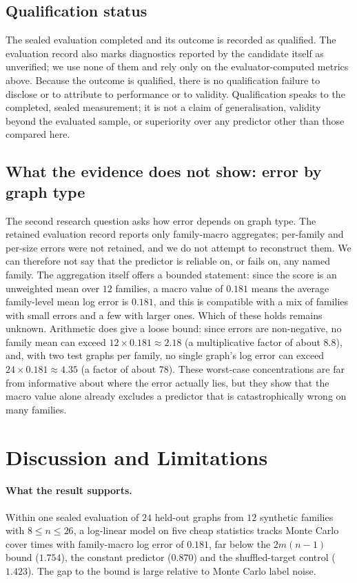 \documentclass{article}
\begin{document}
\subsection{Qualification status}
The sealed evaluation completed and its outcome is recorded as qualified. %
The evaluation record also marks diagnostics reported by the candidate itself as unverified; we use none of them and rely only on the evaluator-computed metrics above. Because the outcome is qualified, there is no qualification failure to disclose or to attribute to performance or to validity. Qualification speaks to the completed, sealed measurement; it is not a claim of generalisation, validity beyond the evaluated sample, or superiority over any predictor other than those compared here.

\subsection{What the evidence does not show: error by graph type}
The second research question asks how error depends on graph type. The retained evaluation record reports only family-macro aggregates; per-family and per-size errors were not retained, and we do not attempt to reconstruct them. We can therefore not say that the predictor is reliable on, or fails on, any named family. The aggregation itself offers a bounded statement: since the score is an unweighted mean over $12$ families, a macro value of $0.181$ means the average family-level mean log error is $0.181$, and this is compatible with a mix of families with small errors and a few with larger ones. Which of these holds remains unknown. Arithmetic does give a loose bound: since errors are non-negative, no family mean can exceed $12\times0.181\approx2.18$ (a multiplicative factor of about $8.8$), and, with two test graphs per family, no single graph's log error can exceed $24\times0.181\approx4.35$ (a factor of about $78$). %
These worst-case concentrations are far from informative about where the error actually lies, but they show that the macro value alone already excludes a predictor that is catastrophically wrong on many families.

\section{Discussion and Limitations}
\label{sec:discussion}
\paragraph{What the result supports.} Within one sealed evaluation of $24$ held-out graphs from $12$ synthetic families with $8\le n\le 26$, a log-linear model on five cheap statistics tracks Monte Carlo cover times with family-macro log error of $0.181$, far below the $2m(n-1)$ bound ($1.754$), the constant predictor ($0.870$) and the shuffled-target control ($1.423$). The gap to the bound is large relative to Monte Carlo label noise.
\end{document}
